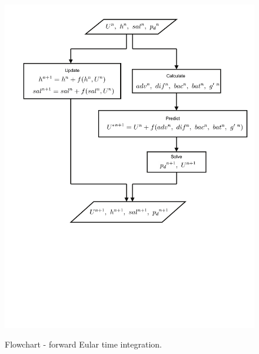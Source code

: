 \begin{figure}[htbp]
\hspace{0.2in}
\includegraphics[width=5.5in]{../figures/flowcharts/TimeIntegration-ForwardEuler.pdf}
\label{fig:flowchart-ForwardEuler}
\caption{Flowchart - forward Eular time integration. }
\end{figure}

